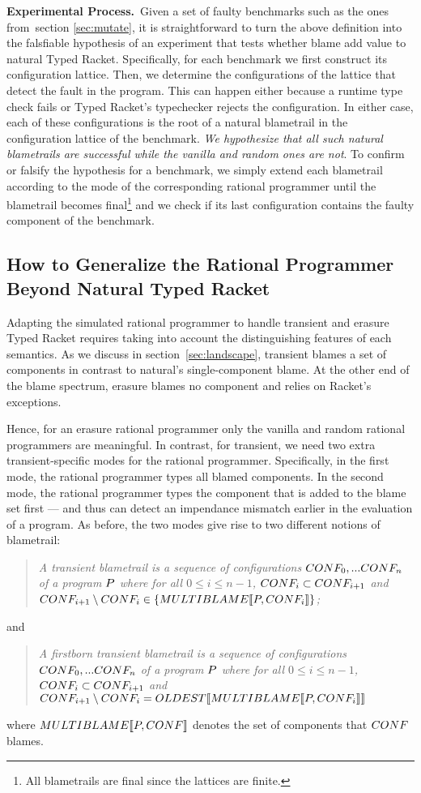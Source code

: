 \noindent
{\bf Experimental Process.}~Given a set of faulty benchmarks such as the ones
from~section \ref{sec:mutate}, it is straightforward to turn the above definition
into the falsfiable hypothesis of an experiment that tests whether blame
add value to natural Typed Racket. Specifically, for each benchmark
we first construct its configuration lattice. Then, we determine the
configurations of the lattice that detect the fault in the
program. This can happen either because a
 runtime type check fails or Typed Racket's typechecker
rejects the configuration. In either case,  each of these configurations is the
root of a natural blametrail in the configuration lattice of the benchmark. \emph{We
hypothesize that all such natural blametrails are successful while the
vanilla and random ones are not}. 
To confirm or falsify the hypothesis for a benchmark, we simply extend each blametrail
 according to the mode of the corresponding rational programmer  until the blametrail
becomes final\footnote{All blametrails are final since the lattices are
finite.} and we check if its last configuration contains the faulty
component of the benchmark. 

\subsection{How to Generalize the Rational Programmer Beyond Natural Typed
Racket} 

Adapting the simulated rational programmer to handle transient
and erasure Typed Racket requires taking into account the distinguishing
features of each semantics. As we discuss in section~\ref{sec:landscape}, 
transient blames a set of components in contrast to natural's
single-component blame. At the other end of the blame spectrum, erasure
blames no component and relies on Racket's exceptions.

Hence, for an erasure rational programmer only the vanilla and random 
rational programmers are meaningful. In contrast, for transient, we 
need two extra transient-specific modes for the rational
programmer. Specifically, in the first mode, the rational programmer types
all blamed components.  In the second mode, the rational programmer types
the component that is added to the blame set first --- and thus can 
detect an impendance mismatch earlier in the evaluation of a program. 
As before, the two modes give
rise to two different notions of blametrail:
\begin{quote}
\it 
A  transient blametrail
is a sequence of configurations $CONF_0,...CONF_n$ of a program
$P$ where for all $0 \leq i \leq n - 1$, $CONF_i \subset CONF_{i+1}$ and
~$CONF_{i+1} \setminus CONF_i \in \{MULTIBLAME\llbracket P, CONF_i\rrbracket\}$;
\end{quote}
\noindent
and
\begin{quote}
\it 
A firstborn transient blametrail
is a sequence of configurations $CONF_0,...CONF_n$ of a program
$P$ where for all $0 \leq i \leq n - 1$, $CONF_i \subset CONF_{i+1}$ and
  $CONF_{i+1} \setminus CONF_i = OLDEST\llbracket MULTIBLAME\llbracket P, CONF_i\rrbracket\rrbracket$
\end{quote}
\noindent
where $MULTIBLAME\llbracket P, CONF\rrbracket$ denotes the set of components that $CONF$
blames. 

